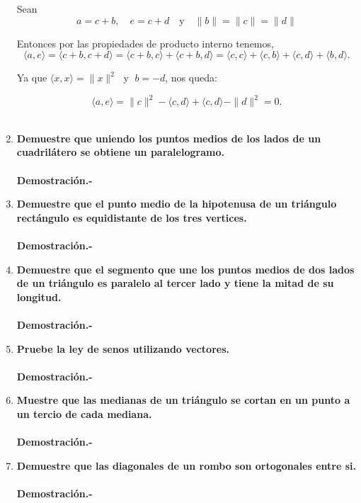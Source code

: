 \begin{enumerate}
	Sean
	$$a=c+b, \quad  e=c+d \quad \mbox{y}\quad \|b\|=\|c\|=\|d\|$$

	Entonces por las propiedades de producto interno tenemos,
	$$\langle a,e\rangle = \langle c+b,c+d\rangle =\langle c+b, c\rangle + \langle c+b, d\rangle = \langle c,c \rangle +\langle c,b\rangle +\langle c,d\rangle +\langle b,d \rangle.$$

    	Ya que $\langle x,x \rangle = \|x\|^2\;$ y $\; b=-d$, nos queda:

	$$\langle a,e\rangle = \|c\|^2 -\langle c,d\rangle +\langle c,d\rangle -\|d\|^2 = 0.$$\\


    \item \textbf{\boldmath Demuestre que uniendo los puntos medios de los lados de un cuadrilátero se obtiene un paralelogramo.\\\\
	Demostración.-}\;

    \item \textbf{\boldmath Demuestre que el punto medio de la hipotenusa de un triángulo rectángulo es equidistante de los tres vertices.\\\\
	Demostración.-}\;

    \item \textbf{\boldmath Demuestre que el segmento que une los puntos medios de dos lados de un triángulo es paralelo al tercer lado y tiene la mitad de su longitud.\\\\
	Demostración.-}\;

    \item \textbf{\boldmath Pruebe la ley de senos utilizando vectores.\\\\
	Demostración.-}\; 

    \item \textbf{\boldmath Muestre que las medianas de un triángulo se cortan en un punto a un tercio de cada mediana.\\\\
	Demostración.-}\;

    \item \textbf{\boldmath Demuestre que las diagonales de un rombo son ortogonales entre si.\\\\
	Demostración.-}\;


\end{enumerate}
